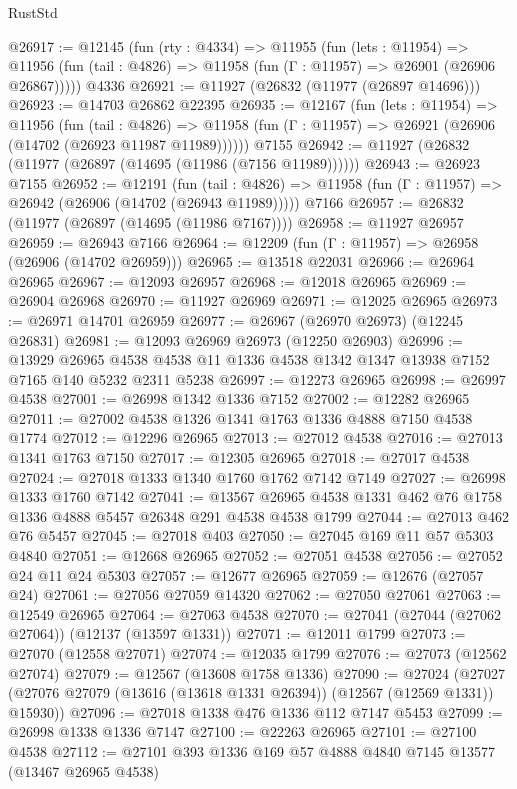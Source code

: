 \begin{lexlean}{RustStd}
\begin{coremodule}
@26917 := @12145
    (fun (rty : @4334) =>
    @11955
      (fun (lets : @11954) =>
      @11956 (fun (tail : @4826) => @11958 (fun (Γ : @11957) => @26901 (@26906 @26867)))))
    @4336
@26921 := @11927 (@26832 (@11977 (@26897 @14696)))
@26923 := @14703 @26862 @22395
@26935 := @12167
    (fun (lets : @11954) =>
    @11956
      (fun (tail : @4826) =>
      @11958 (fun (Γ : @11957) => @26921 (@26906 (@14702 (@26923 @11987 @11989))))))
    @7155
@26942 := @11927 (@26832 (@11977 (@26897 (@14695 (@11986 (@7156 @11989))))))
@26943 := @26923 @7155
@26952 := @12191
    (fun (tail : @4826) => @11958 (fun (Γ : @11957) => @26942 (@26906 (@14702 (@26943 @11989)))))
    @7166
@26957 := @26832 (@11977 (@26897 (@14695 (@11986 @7167))))
@26958 := @11927 @26957
@26959 := @26943 @7166
@26964 := @12209 (fun (Γ : @11957) => @26958 (@26906 (@14702 @26959)))
@26965 := @13518 @22031
@26966 := @26964 @26965
@26967 := @12093 @26957
@26968 := @12018 @26965
@26969 := @26904 @26968
@26970 := @11927 @26969
@26971 := @12025 @26965
@26973 := @26971 @14701 @26959
@26977 := @26967 (@26970 @26973) (@12245 @26831)
@26981 := @12093 @26969 @26973 (@12250 @26903)
@26996 := @13929
    @26965
    @4538
    @4538
    @11
    @1336
    @4538
    @1342
    @1347
    @13938
    @7152
    @7165
    @140
    @5232
    @2311
    @5238
@26997 := @12273 @26965
@26998 := @26997 @4538
@27001 := @26998 @1342 @1336 @7152
@27002 := @12282 @26965
@27011 := @27002 @4538 @1326 @1341 @1763 @1336 @4888 @7150 @4538 @1774
@27012 := @12296 @26965
@27013 := @27012 @4538
@27016 := @27013 @1341 @1763 @7150
@27017 := @12305 @26965
@27018 := @27017 @4538
@27024 := @27018 @1333 @1340 @1760 @1762 @7142 @7149
@27027 := @26998 @1333 @1760 @7142
@27041 := @13567 @26965 @4538 @1331 @462 @76 @1758 @1336 @4888 @5457 @26348 @291 @4538 @4538 @1799
@27044 := @27013 @462 @76 @5457
@27045 := @27018 @403
@27050 := @27045 @169 @11 @57 @5303 @4840
@27051 := @12668 @26965
@27052 := @27051 @4538
@27056 := @27052 @24 @11 @24 @5303
@27057 := @12677 @26965
@27059 := @12676 (@27057 @24)
@27061 := @27056 @27059 @14320
@27062 := @27050 @27061
@27063 := @12549 @26965
@27064 := @27063 @4538
@27070 := @27041 (@27044 (@27062 @27064)) (@12137 (@13597 @1331))
@27071 := @12011 @1799
@27073 := @27070 (@12558 @27071)
@27074 := @12035 @1799
@27076 := @27073 (@12562 @27074)
@27079 := @12567 (@13608 @1758 @1336)
@27090 := @27024
    (@27027 (@27076 @27079 (@13616 (@13618 @1331 @26394)) (@12567 (@12569 @1331)) @15930))
@27096 := @27018 @1338 @476 @1336 @112 @7147 @5453
@27099 := @26998 @1338 @1336 @7147
@27100 := @22263 @26965
@27101 := @27100 @4538
@27112 := @27101 @393 @1336 @169 @57 @4888 @4840 @7145 @13577 (@13467 @26965 @4538)

\end{coremodule}
\end{lexlean}
